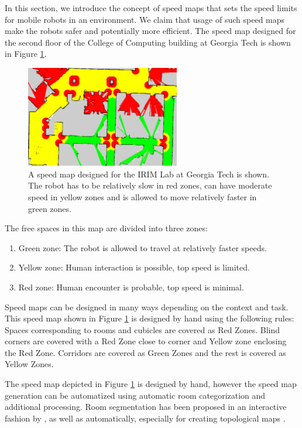 In this section, we introduce the concept of speed maps that sets the speed limits for mobile robots in an environment. We claim that usage of such speed maps make the robots safer and potentially more efficient. The speed map designed for the second floor of the College of Computing building at Georgia Tech is shown in Figure \ref{fig:speed_map_irim}.

\begin{figure}[h!]
\centering
\includegraphics[width=0.6\textwidth]{pics/intro}
\caption{A speed map designed for the IRIM Lab at Georgia Tech is shown. The robot has to be relatively slow in red zones, can have moderate speed in yellow zones and is allowed to move relatively faster in green zones.}
\label{fig:speed_map_irim}
\end{figure}

The free spaces in this map are divided into three zones:
\begin{enumerate}
\item Green zone: The robot is allowed to travel at relatively faster speeds.
\item Yellow zone: Human interaction is possible, top speed is limited.
\item Red zone: Human encounter is probable, top speed is minimal.
\end{enumerate}

Speed maps can be designed in many ways depending on the context and task. This speed map shown in Figure \ref{fig:speed_map_irim} is designed by hand using the following rules: Spaces corresponding to rooms and cubicles are covered as Red Zones. Blind corners are covered with a Red Zone close to corner and Yellow zone enclosing the Red Zone. Corridors are covered as Green Zones and the rest is covered as Yellow Zones. 

The speed map depicted in Figure \ref{fig:speed_map_irim} is designed by hand, however the speed map generation can be automatized using automatic room categorization and additional processing. Room segmentation has been proposed in an interactive fashion by \cite{diosi2005interactive}, as well as automatically, especially for creating topological maps \cite{mozos2007supervised}.

